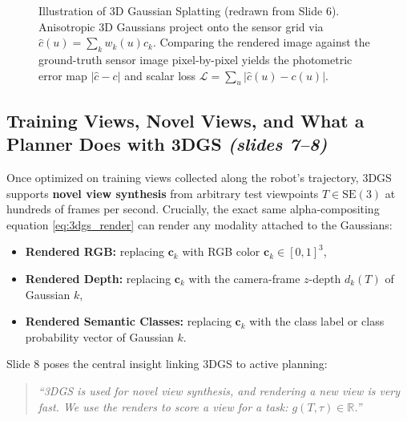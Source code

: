 \documentclass[11pt,a4paper]{article}
\theoremstyle{definition}
\theoremstyle{plain}
\theoremstyle{remark}
\begin{document}
\begin{figure}[htbp]
\caption{Illustration of 3D Gaussian Splatting (redrawn from Slide 6). Anisotropic 3D Gaussians project onto the sensor grid via $\hat{c}(u) = \sum_k w_k(u)c_k$. Comparing the rendered image against the ground-truth sensor image pixel-by-pixel yields the photometric error map $|\hat{c}-c|$ and scalar loss $\mathcal{L} = \sum_u |\hat{c}(u) - c(u)|$.}
\label{fig:3dgs_work}
\end{figure}

\subsection{Training Views, Novel Views, and What a Planner Does with 3DGS \emph{(slides 7--8)}}

Once optimized on training views collected along the robot's trajectory, 3DGS supports \textbf{novel view synthesis} from arbitrary test viewpoints $T \in \mathrm{SE}(3)$ at hundreds of frames per second. Crucially, the exact same alpha-compositing equation \eqref{eq:3dgs_render} can render any modality attached to the Gaussians:
\begin{itemize}[leftmargin=*]
    \item \textbf{Rendered RGB:} replacing $\mathbf{c}_k$ with RGB color $\mathbf{c}_k \in [0,1]^3$,
    \item \textbf{Rendered Depth:} replacing $\mathbf{c}_k$ with the camera-frame $z$-depth $d_k(T)$ of Gaussian $k$,
    \item \textbf{Rendered Semantic Classes:} replacing $\mathbf{c}_k$ with the class label or class probability vector of Gaussian $k$.
\end{itemize}

Slide 8 poses the central insight linking 3DGS to active planning:
\begin{quote}
\emph{``3DGS is used for novel view synthesis, and rendering a new view is very fast. We use the renders to score a view for a task: $g(T, \tau) \in \mathbb{R}$.''}
\end{quote}
\end{document}
